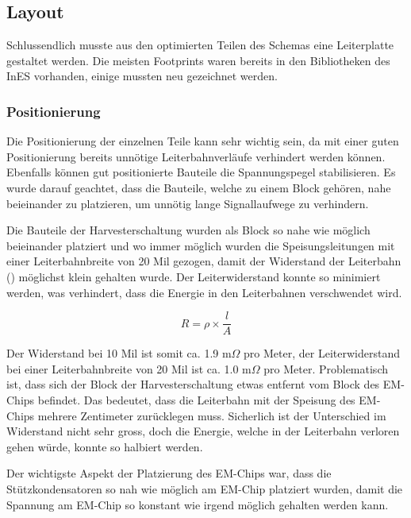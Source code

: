 \subsection{Layout}

Schlussendlich musste aus den optimierten Teilen des Schemas eine Leiterplatte gestaltet werden. Die meisten Footprints waren bereits in den Bibliotheken des InES vorhanden, einige mussten neu gezeichnet werden.

\subsubsection{Positionierung}

Die Positionierung der einzelnen Teile kann sehr wichtig sein, da mit einer guten Positionierung bereits unnötige Leiterbahnverläufe verhindert werden können. Ebenfalls können gut positionierte Bauteile die Spannungspegel stabilisieren. Es wurde darauf geachtet, dass die Bauteile, welche zu einem Block gehören, nahe beieinander zu platzieren, um unnötig lange Signallaufwege zu verhindern.

Die Bauteile der Harvesterschaltung wurden als Block so nahe wie möglich beieinander platziert und wo immer möglich wurden die Speisungsleitungen mit einer Leiterbahnbreite von 20 Mil gezogen, damit der Widerstand der Leiterbahn (\cite{eqn_res_leiter}) möglichst klein gehalten wurde. Der Leiterwiderstand konnte so minimiert werden, was verhindert, dass die Energie in den Leiterbahnen verschwendet wird.

\begin{equation}
	R = \rho \times \frac{l}{A}
\end{equation}

Der Widerstand bei 10 Mil ist somit ca. 1.9 m$\Omega$ pro Meter, 
der Leiterwiderstand bei einer Leiterbahnbreite von 20 Mil ist ca. 1.0 m$\Omega$ pro Meter. Problematisch ist, dass sich der Block der Harvesterschaltung etwas entfernt vom Block des EM-Chips befindet. Das bedeutet, dass die Leiterbahn mit der Speisung des EM-Chips mehrere Zentimeter zurücklegen muss. Sicherlich ist der Unterschied im Widerstand nicht sehr gross, doch die Energie, welche in der Leiterbahn verloren gehen würde, konnte so halbiert werden.

Der wichtigste Aspekt der Platzierung des EM-Chips war, dass die Stützkondensatoren so nah wie möglich am EM-Chip platziert wurden, damit die Spannung am EM-Chip so konstant wie irgend möglich gehalten werden kann.


